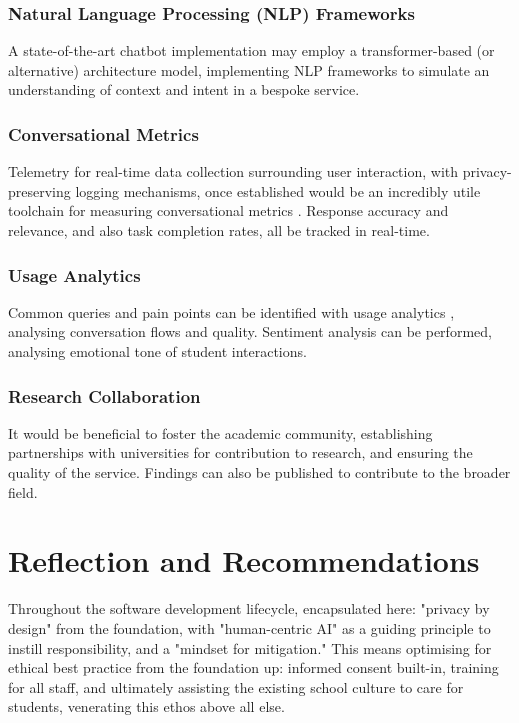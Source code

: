 \documentclass[14pt,a4paper]{article}
\begin{document}
\begin{multicols}{2}
\subsubsection{Natural Language Processing (NLP) Frameworks}
A state-of-the-art chatbot implementation may employ a transformer-based (or alternative) architecture model, implementing NLP frameworks \textit{\parencite[pp. 1-15]{JurafskyMartin2024}} to simulate an understanding of context and intent in a bespoke service.

\subsubsection{Conversational Metrics}
Telemetry \textit{\parencite[pp. 30-60]{Vadapalli2024}} for real-time data collection surrounding user interaction, with privacy-preserving logging mechanisms, once established would be an incredibly utile toolchain for measuring conversational metrics \textit{\parencite[pp. 1-32]{Quarteroni2024}}.
Response accuracy and relevance, and also task completion rates, all be tracked in real-time.


\subsubsection{Usage Analytics}
Common queries and pain points can be identified with usage analytics \textit{\parencite[pp. 50-100]{Beasley2024}}, analysing conversation flows and quality.
Sentiment analysis \textit{\parencite[pp. 50-100]{Liu2024}} can be performed, analysing emotional tone of student interactions.

\subsubsection{Research Collaboration}
    It would be beneficial to foster the academic community, establishing partnerships with universities \textit{\parencite[pp. 50-100]{Dillenbourg2024}} for contribution to research, and ensuring the quality of the service.
    Findings can also be published to contribute to the broader field.

\end{multicols}

\section{Reflection and Recommendations}
Throughout the software development lifecycle, encapsulated here: "privacy by design" from the foundation, with "human-centric AI" as a guiding principle to instill responsibility, and a "mindset for mitigation."
This means optimising for ethical best practice from the foundation up: informed consent built-in, training for all staff, and ultimately assisting the existing school culture to care for students, venerating this ethos above all else.
\end{document}
